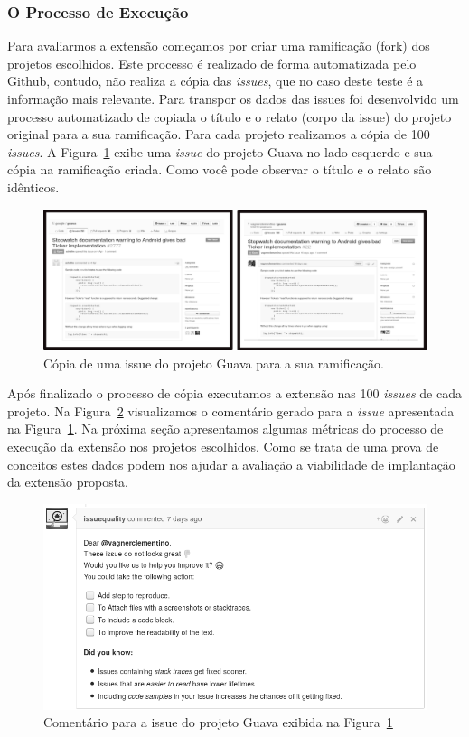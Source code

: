 \subsubsection{O Processo de Execução}
\label{sub:implementacao_processo_execucao}

Para avaliarmos a extensão começamos por criar uma ramificação (fork) dos
projetos escolhidos. Este processo é realizado de forma automatizada pelo
Github, contudo, não realiza a cópia das \textit{issues}, que no caso deste
teste é a informação mais relevante. Para transpor os dados das issues foi
desenvolvido um processo automatizado de copiada o título e o relato (corpo da
issue) do projeto original para a sua ramificação. Para cada projeto realizamos
a cópia de 100 \textit{issues}. A Figura~\ref{fig:copia-de-issues} exibe uma
\textit{issue} do projeto Guava no lado esquerdo e sua cópia na ramificação
criada. Como você pode observar o título e o relato são idênticos.

\begin{figure}[htpb]
    \centering
    \includegraphics[width=1.1\linewidth]{chapter-implementacao-extensoes-fgrm/img/copia-de-issues.png}
    \caption{Cópia de uma issue do projeto Guava para a sua ramificação.}
\label{fig:copia-de-issues}
\end{figure}

Após finalizado o processo de cópia executamos a extensão nas 100
\textit{issues} de cada projeto. Na Figura~\ref{fig:exemplo_comentario_issue}
visualizamos o comentário gerado para a \textit{issue} apresentada na
Figura~\ref{fig:copia-de-issues}. Na próxima seção apresentamos algumas métricas
do processo de execução da extensão nos projetos escolhidos. Como se trata de
uma prova de conceitos estes dados podem nos ajudar a avaliação a viabilidade de
implantação da extensão proposta.

\begin{figure}[htpb]
    \centering
    \includegraphics[width=0.7\linewidth]{chapter-implementacao-extensoes-fgrm/img/exemplo_comentario_issue.png}
    \caption{Comentário para a issue do projeto Guava exibida na Figura~\ref{fig:copia-de-issues}}
\label{fig:exemplo_comentario_issue}
\end{figure}

